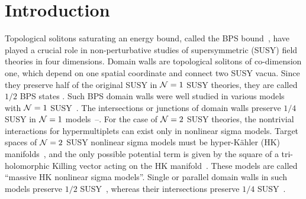\documentclass[a4paper,12pt]{article}
\newcommand{\kahler}{K\"{a}hler }
\begin{document}
\section{Introduction}\label{INTRO}

Topological solitons saturating an energy bound, 
called the BPS bound~\cite{BPS,WittenOlive}, 
have played a crucial role in 
non-perturbative studies of supersymmetric 
(SUSY) field theories in four dimensions.  
Domain walls are topological solitons of co-dimension one, 
which depend on one spatial coordinate and connect two SUSY vacua.
Since they preserve half of the original SUSY in 
${\cal N}=1$ SUSY theories, 
they are called $1/2$ BPS states \cite{Gauntlett}.  
Such BPS domain walls were well studied 
in various models with 
${\cal N}=1$ SUSY~\cite{CGR,DvaliShifman}.  
The intersections or junctions of domain walls 
preserve $1/4$ SUSY in ${\cal N}=1$ 
models~\cite{AbrahamTownsend}--\cite{NNS}. 
For the case of ${\cal N}=2$ SUSY theories, 
the nontrivial interactions for hypermultiplets can exist only 
in nonlinear sigma models. 
Target spaces of ${\cal N}=2$ SUSY nonlinear sigma models 
must be hyper-\kahler (HK) manifolds~\cite{AF1}, 
and the only possible potential term is given by  
the square of a tri-holomorphic 
Killing vector acting on the HK manifold~\cite{AF2,Sierra}. 
These models are called ``massive HK nonlinear sigma models''.  
Single or parallel domain walls in such models 
preserve $1/2$ SUSY~\cite{AT,Townsend3}, 
whereas their intersections preserve $1/4$ SUSY~\cite{Townsend1}. 
\end{document}
